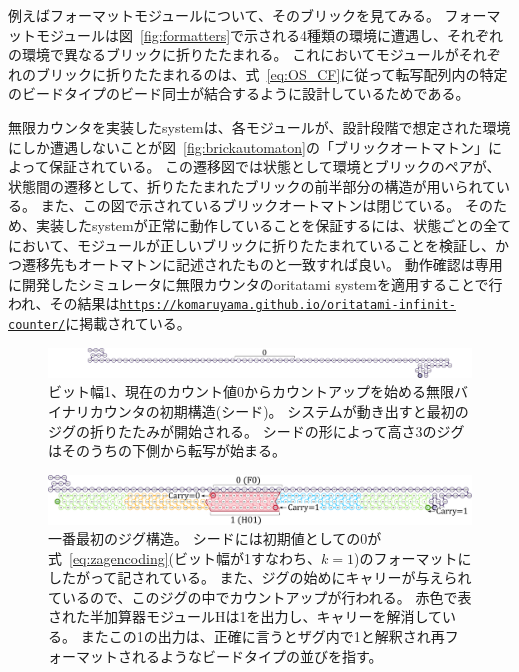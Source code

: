 \documentclass[a4,11pt]{article}
\begin{document}
例えばフォーマットモジュールについて、そのブリックを見てみる。
フォーマットモジュールは図~\ref{fig:formatters}で示される4種類の環境に遭遇し、それぞれの環境で異なるブリックに折りたたまれる。
これにおいてモジュールがそれぞれのブリックに折りたたまれるのは、式~\eqref{eq:OS_CF}に従って転写配列内の特定のビードタイプのビード同士が結合するように設計しているためである。

無限カウンタを実装したsystemは、各モジュールが、設計段階で想定された環境にしか遭遇しないことが図~\ref{fig:brickautomaton}の「ブリックオートマトン」によって保証されている。
この遷移図では状態として環境とブリックのペアが、状態間の遷移として、折りたたまれたブリックの前半部分の構造が用いられている。
また、この図で示されているブリックオートマトンは閉じている。
そのため、実装したsystemが正常に動作していることを保証するには、状態ごとの全てにおいて、モジュールが正しいブリックに折りたたまれていることを検証し、かつ遷移先もオートマトンに記述されたものと一致すれば良い。
動作確認は専用に開発したシミュレータに無限カウンタのoritatami systemを適用することで行われ、その結果は\href{https://komaruyama.github.io/oritatami-infinit-counter/}{\texttt{https://komaruyama.github.io/oritatami-infinit-counter/}}に掲載されている。

\newpage
%
%
%
\begin{figure}[h]
\centering
\includegraphics[width=\linewidth]{fig/svg/zigzag01.pdf}
\caption{
ビット幅1、現在のカウント値0からカウントアップを始める無限バイナリカウンタの初期構造(シード)。
システムが動き出すと最初のジグの折りたたみが開始される。
シードの形によって高さ3のジグはそのうちの下側から転写が始まる。
}
\label{fig:counterseed}
\end{figure}

\begin{figure}[h]
\centering
\includegraphics[width=\linewidth]{fig/svg/CounterEx5_1.pdf}
\caption{
一番最初のジグ構造。
シードには初期値としての0が式~\eqref{eq:zagencoding}(ビット幅が1すなわち、$k=1$)のフォーマットにしたがって記されている。
また、ジグの始めにキャリーが与えられているので、このジグの中でカウントアップが行われる。
赤色で表された半加算器モジュールHは1を出力し、キャリーを解消している。
またこの1の出力は、正確に言うとザグ内で1と解釈され再フォーマットされるようなビードタイプの並びを指す。
}

\label{fig:counter1stzig}
\end{figure}
\end{document}
